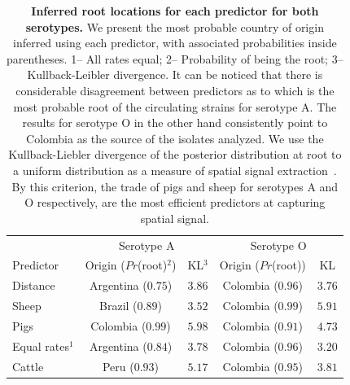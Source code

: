 \documentclass[10pt]{article}
\begin{document}
\begin{table}[H]
\caption{
\textbf{Inferred root locations for each predictor for both serotypes.} 
We present the most probable country of origin inferred using each predictor, with associated probabilities inside parentheses. 1-- All rates equal; 2-- Probability of being the root; 3-- Kullback-Leibler divergence.
It can be noticed that there is considerable disagreement between predictors as to which is the most probable root of the circulating strains for serotype A.
The results for serotype O in the other hand consistently point to Colombia as the source of the isolates analyzed.
We use the Kullback-Liebler divergence of the posterior distribution at root to a uniform distribution as a measure of spatial signal extraction~\cite{roots}.
By this criterion, the trade of pigs and sheep for serotypes A and O respectively, are the most efficient predictors at capturing spatial signal.
}
\begin{center}
\begin{tabular}{lcccc}
\toprule
& \multicolumn{2}{c}{Serotype A}&\multicolumn{2}{c}{Serotype O}\\
Predictor& Origin ($Pr$(root)$^2$)& KL$^3$&Origin ($Pr$(root))& KL\\
\midrule
Distance & Argentina ($0.75$)& $3.86$ & Colombia ($0.96$)& $3.76$\\
Sheep    & Brazil ($0.89$) & $3.52$ & Colombia ($0.99$)& $5.91$\\
Pigs      & Colombia ($0.99$)& $5.98$& Colombia ($0.91$)& $4.73$\\
Equal rates$^1$  & Argentina ($0.84$)& $3.78$ &Colombia  ($0.96$)& $3.20$\\
Cattle   & Peru ($0.93$)& $5.17$ & Colombia ($0.95$)& $3.81$\\
 \bottomrule
\end{tabular}
\end{center}
\begin{flushleft}
\end{flushleft}
\label{tab:roots}
 \end{table}
\end{document}
